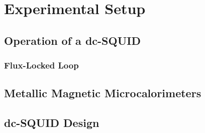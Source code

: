 \chapter{Experimental Setup}

\section{Operation of a dc-SQUID}

\subsection{Flux-Locked Loop}

\section{Metallic Magnetic Microcalorimeters} 

\section{dc-SQUID Design}